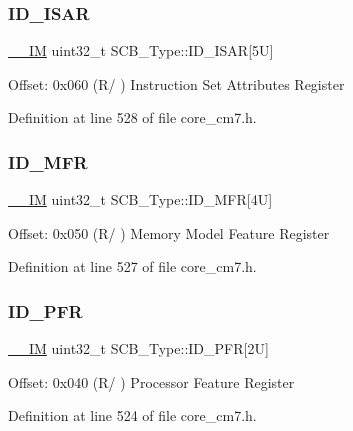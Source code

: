 \subsubsection{\texorpdfstring{I\+D\+\_\+\+I\+S\+AR}{ID\_ISAR}}
{\footnotesize\ttfamily \hyperlink{core__sc300_8h_a4cc1649793116d7c2d8afce7a4ffce43}{\+\_\+\+\_\+\+IM} uint32\+\_\+t S\+C\+B\+\_\+\+Type\+::\+I\+D\+\_\+\+I\+S\+AR\mbox{[}5\+U\mbox{]}}

Offset\+: 0x060 (R/ ) Instruction Set Attributes Register 

Definition at line 528 of file core\+\_\+cm7.\+h.

\mbox{\label{struct_s_c_b___type_a781ef24d88610a432e7d5b179d78de47}} 
\subsubsection{\texorpdfstring{I\+D\+\_\+\+M\+FR}{ID\_MFR}}
{\footnotesize\ttfamily \hyperlink{core__sc300_8h_a4cc1649793116d7c2d8afce7a4ffce43}{\+\_\+\+\_\+\+IM} uint32\+\_\+t S\+C\+B\+\_\+\+Type\+::\+I\+D\+\_\+\+M\+FR\mbox{[}4\+U\mbox{]}}

Offset\+: 0x050 (R/ ) Memory Model Feature Register 

Definition at line 527 of file core\+\_\+cm7.\+h.

\mbox{\label{struct_s_c_b___type_ab35c6b650d3bb2d11259c0a0285d0d00}} 
\subsubsection{\texorpdfstring{I\+D\+\_\+\+P\+FR}{ID\_PFR}}
{\footnotesize\ttfamily \hyperlink{core__sc300_8h_a4cc1649793116d7c2d8afce7a4ffce43}{\+\_\+\+\_\+\+IM} uint32\+\_\+t S\+C\+B\+\_\+\+Type\+::\+I\+D\+\_\+\+P\+FR\mbox{[}2\+U\mbox{]}}

Offset\+: 0x040 (R/ ) Processor Feature Register 

Definition at line 524 of file core\+\_\+cm7.\+h.

\mbox{\label{struct_s_c_b___type_a00e93446b3433a807f1574fa2f1fce54}} 
